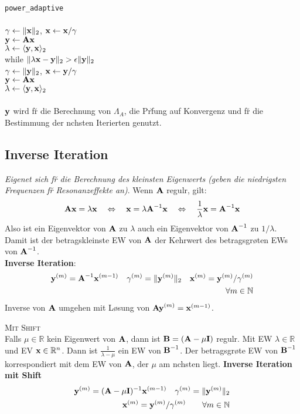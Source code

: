 \verb!power_adaptive!\\
{\addtolength{\leftskip}{0mm}
\hrulefill\\
$\gamma \leftarrow \Vert \mbox{\bf x} \Vert_2$, $\mbox{\bf x} \leftarrow \mbox{\bf x}/\gamma$ \\
$\mbox{\bf y} \leftarrow \mbox{\bf Ax}$\\
$\lambda \leftarrow \langle \mbox{\bf y},\mbox{\bf x} \rangle_2$\\
while $\Vert \lambda\mbox{\bf x} - \mbox{\bf y} \Vert_2 > \epsilon \Vert \mbox{\bf y} \Vert_2$ \\ 
\quad $\gamma \leftarrow \Vert \mbox{\bf y} \Vert_2$, $\mbox{\bf x} \leftarrow \mbox{\bf y}/\gamma$ \\
\quad $\mbox{\bf y} \leftarrow \mbox{\bf Ax}$\\
\quad $\lambda \leftarrow \langle \mbox{\bf y},\mbox{\bf x} \rangle_2$\\
\hrulefill\\
}
$\mbox{\bf y}$ wird f\u r die Berechnung von $\Lambda_A$, die Pr\u fung auf Konvergenz und f\u r die Bestimmung der n\a chsten Iterierten genutzt.

\subsection{Inverse Iteration}
\emph{Eigenet sich f\u r die Berechnung des kleinsten Eigenwerts (geben die niedrigsten Frequenzen f\u r Resonanzeffekte an)}.
Wenn $\mbox{\bf A}$ regul\a r, gilt:
\begin{align*}
\mbox{\bf Ax} = \lambda\mbox{\bf x} \quad\Leftrightarrow\quad \mbox{\bf x} = \lambda\mbox{\bf A}^{-1}\mbox{\bf x} \quad\Leftrightarrow\quad \frac{1}{\lambda}\mbox{\bf x} = \mbox{\bf A}^{-1}\mbox{\bf x}
\end{align*}
Also ist ein Eigenvektor von $\mbox{\bf A}$ zu $\lambda$ auch ein Eigenvektor von $\mbox{\bf A}^{-1}$ zu $1/\lambda$. Damit ist der betragskleinste EW von $\mbox{\bf A}$ der Kehrwert des betragsgr\o \s ten EWs von $\mbox{\bf A}^{-1}$.\\
\textbf{Inverse Iteration}:
\begin{align*}
\mbox{\bf y}^{(m)} = \mbox{\bf A}^{-1}\mbox{\bf x}^{(m-1)} \quad \gamma^{(m)} = \Vert \mbox{\bf y}^{(m)} \Vert_2 \quad \mbox{\bf x}^{(m)} = \mbox{\bf y}^{(m)}/\gamma^{(m)} \\ \forall m\in \mathbb{N}
\end{align*}
Inverse von $\mbox{\bf A}$ umgehen mit L\o sung von $\mbox{\bf Ay}^{(m)} = \mbox{\bf x}^{(m-1)}$.

\textsc{Mit Shift}\\
Falls $\mu \in \mathbb{R}$ kein Eigenwert von $\mbox{\bf A}$, dann ist $\mbox{\bf B}=(\mbox{\bf A}-\mu \mbox{\bf I})$ regul\a r. Mit EW $\lambda \in \mathbb{R}$ und EV $\mbox{\bf x} \in \mathbb{R}^{n}$. Dann ist $\frac{1}{\lambda-\mu}$ ein EW von $\mbox{\bf B}^{-1}$. Der betragsgr\o \s te EW von $\mbox{\bf B}^{-1}$ korrespondiert mit dem EW von $\mbox{\bf A}$, der $\mu$ am n\a chsten liegt.
\textbf{Inverse Iteration mit Shift}
\begin{align*}
\mbox{\bf y}^{(m)} = (\mbox{\bf A}-\mu \mbox{\bf I})^{-1}\mbox{\bf x}^{(m-1)} \quad \gamma^{(m)} = \Vert \mbox{\bf y}^{(m)} \Vert_2 \\ \mbox{\bf x}^{(m)} = \mbox{\bf y}^{(m)}/\gamma^{(m)}  \qquad \forall m\in \mathbb{N}
\end{align*}

